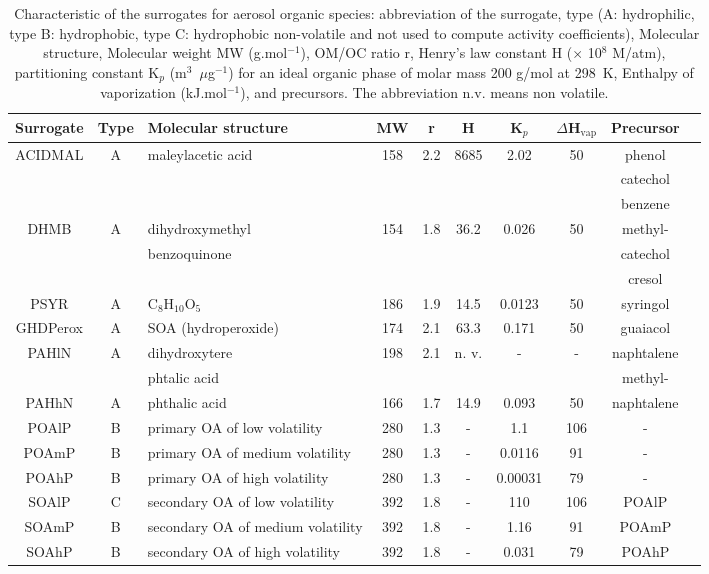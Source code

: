\documentclass[a4paper,11pt]{article}
\begin{document}
\begin{footnotesize}
\begin{table}
\caption{Characteristic of the surrogates for aerosol organic species: abbreviation of the surrogate, type 	
	(A: hydrophilic, type B: hydrophobic, type C: hydrophobic non-volatile and not used to compute activity coefficients),
	Molecular structure, Molecular weight MW (g.mol$^{-1}$), OM/OC ratio r, Henry's law constant H ($\times$ 10$^8$ M/atm), partitioning constant K$_p$
(m$^3$~$\mu$g$^{-1}$) for an ideal organic phase of molar mass 200 g/mol at 298~K, Enthalpy of vaporization (kJ.mol$^{-1}$), and precursors. The abbreviation n.v. means non volatile.}
\centering
\begin{tabular}{|c|c|p{3.8cm}|c|c|c|c|c|c|c}
\hline
	Surrogate & Type & Molecular structure& MW & r & H  & K$_p$ & $\Delta$H$_{\mathrm{vap}}$ & Precursor \\
\hline
	ACIDMAL& A & maleylacetic acid & 158& 2.2 & 8685 & 2.02 & 50 & phenol\\
	       &   &                   &    &     &                         &      &       & catechol\\
	       &   &                   &    &     &                         &      &       & benzene\\
\hline
	DHMB & A & dihydroxymethyl & 154 & 1.8 & 36.2 & 0.026 & 50 & methyl- \\
	     &   &  benzoquinone   &     &      &                        &       &       &  catechol \\
	     &   &     &     &      &                        &       &       &  cresol \\
\hline
	PSYR  &A & C$_{8}$H$_{10}$O$_{5}$& 186 & 1.9 & 14.5  & 0.0123  & 50 & syringol \\
\hline
	GHDPerox &A &  SOA (hydroperoxide) & 174 &2.1 & 63.3 & 0.171 & 50 & guaiacol \\
\hline
	PAHlN & A & dihydroxytere &198& 2.1 & n. v.  & - & - & naphtalene \\
	      &   & phtalic acid                  &   &      &                           &               &   &  methyl- \\
	PAHhN & A & phthalic acid & 166 & 1.7 & 14.9 & 0.093 & 50 & naphtalene\\
\hline
	POAlP & B & primary OA of low volatility & 280 & 1.3 & - & 1.1 & 106 & -    \\
	POAmP & B & primary OA of medium volatility & 280 & 1.3 & - & 0.0116 & 91 & -  \\
	POAhP & B & primary OA of high volatility & 280 & 1.3  & - & 0.00031 & 79 & -  \\
	SOAlP & C & secondary OA of low volatility & 392 & 1.8 & - &  110 & 106 & POAlP    \\
	SOAmP & B & secondary OA of medium volatility & 392 & 1.8 & - & 1.16 & 91 & POAmP   \\
	SOAhP & B & secondary OA of high volatility & 392 & 1.8 & - & 0.031 &79 & POAhP  \\
\end{tabular}
\label{speciesb}
\end{table}


\end{footnotesize}
\end{document}
